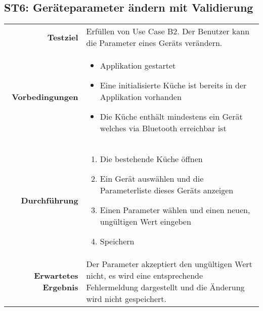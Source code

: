 \subsection{ST6: Geräteparameter ändern mit Validierung}
\begin{table}[H]
\begin{tabularx}{\textwidth}{r X }
\textbf{Testziel} & Erfüllen von Use Case B2. Der Benutzer kann die Parameter eines Geräts verändern. \\
\textbf{Vorbedingungen} & \begin{itemize}
\item Applikation gestartet
\item Eine initialisierte Küche ist bereits in der Applikation vorhanden
\item Die Küche enthält mindestens ein Gerät welches via Bluetooth erreichbar ist
\end{itemize} \\
\textbf{Durchführung} & \begin{enumerate}
\item Die bestehende Küche öffnen
\item Ein Gerät auswählen und die Parameterliste dieses Geräts anzeigen
\item Einen Parameter wählen und einen neuen, ungültigen Wert eingeben
\item Speichern
\end{enumerate} \\
\textbf{Erwartetes Ergebnis} & Der Parameter akzeptiert den ungültigen Wert nicht, es wird eine entsprechende Fehlermeldung dargestellt und die Änderung wird nicht gespeichert.\\
\end{tabularx}
\end{table}


